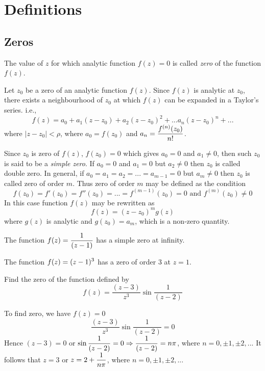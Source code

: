 \section{Definitions}
\subsection{Zeros}
\begin{definition}
The value of $z$ for which analytic function $f(z) = 0$ is called \textit{zero} of the function $f(z)$. 
\end{definition}
Let $z_0$ be a zero of an analytic function $f(z)$. Since $f(z)$ is analytic at $z_0$, there exists a neighbourhood of $z_0$ at which $f(z)$ can be expanded in a Taylor's series. i.e.,
\[
f(z) = a_0 + a_1(z-z_0) + a_2(z-z_0)^2 + ... a_n(z-z_0)^n + ...
\]
where $|z-z_0|< \rho$, where $a_0=f(z_0)$ and $\displaystyle a_n = \frac{f^{(n)}(z_0)}{n!}$.

Since $z_0$ is zero of $f(z)$, $f(z_0)=0$ which gives $a_0=0$ and $a_1 \neq 0$, then such $z_0$ is said to be a \emph{simple zero}. If $a_0=0$ and $a_1=0$ but $a_2 \neq 0$ then $z_0$ is called double zero. In general, if $a_0=a_1=a_2= ... = a_{m-1}=0$ but $a_m \neq 0$ then $z_0$ is called zero of order $m$. Thus zero of order $m$ may be defined as the condition
\begin{equation}
	f(z_0)=f'(z_0)=f''(z_0)= ... = f^{(m-1)}(z_0) =0 \text{ and } f^{(m)}(z_0) \neq 0
\end{equation}
In this case function $f(z)$ may be rewritten as
\begin{equation}
	f(z) = (z-z_0)^m g(z)
\end{equation}
where $g(z)$ is analytic and $g(z_0)=a_m$, which is a non-zero quantity.
\begin{example}
The function $\displaystyle f(z) = \frac{1}{(z-1)}$ has a simple zero at infinity.
\end{example}
\begin{example}
The function $\displaystyle f(z) = (z-1)^3$ has a zero of order 3 at $z=1$.
\end{example}
\begin{example}
Find the zero of the function defined by
\[f(z) = \frac{(z-3)}{z^3} \sin \frac{1}{(z-2)}\]
\end{example}
\begin{solution}
To find zero, we have $f(z)=0$
\[\frac{(z-3)}{z^3} \sin \frac{1}{(z-2)} = 0\]
Hence $(z-3)=0$ or $\displaystyle \sin \frac{1}{(z-2)} = 0 \Rightarrow \frac{1}{(z-2)} = n\pi$, where $n=0, \pm 1, \pm 2, ...$
It follows that $z=3$ or $\displaystyle z = 2 + \frac{1}{n\pi}$, where $n=0, \pm 1, \pm 2, ...$
\end{solution}

